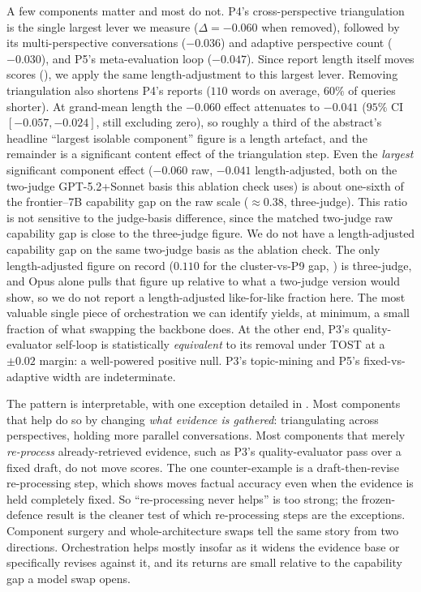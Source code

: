 \documentclass[11pt]{article}
\begin{document}
A few components matter and most do not. P4's cross-perspective triangulation is the
single largest lever we measure ($\Delta=-0.060$ when removed), followed by its
multi-perspective conversations ($-0.036$) and adaptive perspective count ($-0.030$),
and P5's meta-evaluation loop ($-0.047$). Since report length itself moves scores
(), we apply the same length-adjustment to this largest
lever. Removing triangulation also shortens P4's reports ($110$ words on average, $60\%$ of
queries shorter). At grand-mean length the $-0.060$ effect attenuates to $-0.041$ ($95\%$
CI $[-0.057, -0.024]$, still excluding zero), so roughly a third of the abstract's headline
``largest isolable component'' figure is a length artefact, and the remainder is a
significant content effect of the triangulation step. Even the \emph{largest}
significant component effect ($-0.060$ raw, $-0.041$ length-adjusted, both on the two-judge
GPT-5.2+Sonnet basis this ablation check uses) is about one-sixth of the
frontier--7B capability gap on the raw scale ($\approx0.38$, three-judge). This ratio is not
sensitive to the judge-basis difference, since the matched two-judge raw capability gap is
close to the three-judge figure. We do not have a length-adjusted capability gap on the same
two-judge basis as the ablation check. The only
length-adjusted figure on record ($0.110$ for the cluster-vs-P9 gap, )
is three-judge, and Opus alone pulls that figure up relative to what a two-judge version
would show, so we do not report a length-adjusted like-for-like fraction here. The most
valuable single
piece of orchestration we can identify yields, at minimum, a small fraction of what swapping the
backbone does. At the other end, P3's quality-evaluator
self-loop is statistically \emph{equivalent} to its removal under TOST at a $\pm0.02$
margin: a well-powered positive null. P3's topic-mining and
P5's fixed-vs-adaptive width are indeterminate.

The pattern is interpretable, with one exception detailed in
. Most components that help do so by changing
\emph{what evidence is gathered}: triangulating across perspectives, holding more
parallel conversations. Most components that merely \emph{re-process}
already-retrieved evidence, such as P3's quality-evaluator pass over a fixed draft, do
not move scores. The one counter-example is a draft-then-revise re-processing step,
which  shows moves factual accuracy even when the evidence is
held completely fixed. So ``re-processing never helps'' is too strong; the frozen-defence
result is the cleaner test of which re-processing steps are the exceptions. Component surgery
and whole-architecture swaps tell the same story from two directions.
Orchestration helps mostly insofar as it widens the evidence
base or specifically revises against it, and its returns are small relative to the
capability gap a model swap opens.
\end{document}
